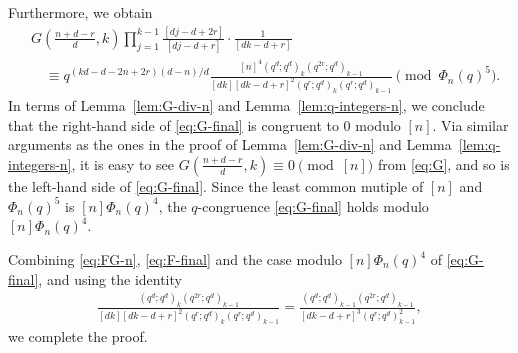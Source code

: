 \documentclass[12pt]{article}
\numberwithin{equation}{section}
\begin{document}
Furthermore, we obtain
\begin{align}\label{eq:G-final}
    &G\left(\frac{n+d-r}{d},k\right)\prod_{j=1}^{k-1}\frac{[dj-d+2r]}{[dj-d+r]}\cdot\frac{1}{[dk-d+r]}\nonumber\\
    &\hspace{1em}\equiv q^{(kd-d-2n+2r)(d-n)/d}\frac{[n]^4(q^d;q^d)_{k}(q^{2r};q^d)_{k-1}}{[dk][dk-d+r]^2 (q^r;q^d)_k(q^r;q^d)_{k-1}}\pmod{\Phi_n(q)^5}.
\end{align}
In terms of Lemma~\ref{lem:G-div-n} and Lemma~\ref{lem:q-integers-n}, we conclude that the right-hand side of \eqref{eq:G-final} is congruent to 0 modulo $[n]$.
Via similar arguments as the ones in the proof of Lemma~\ref{lem:G-div-n} and Lemma~\ref{lem:q-integers-n}, it is easy to see $G(\frac{n+d-r}{d},k)\equiv0 \pmod{[n]}$
from \eqref{eq:G}, and so is the left-hand side of \eqref{eq:G-final}. Since the least common mutiple of $[n]$ and $\Phi_n(q)^5$ is $[n]\Phi_n(q)^4$, the $q$-congruence
\eqref{eq:G-final} holds modulo $[n]\Phi_n(q)^4$. \par
Combining \eqref{eq:FG-n}, \eqref{eq:F-final} and the case modulo $[n]\Phi_n(q)^4$ of \eqref{eq:G-final}, and using the identity
\begin{align}\label{eq:iden}
    \frac{(q^d;q^d)_{k}(q^{2r};q^d)_{k-1}}{[dk][dk-d+r]^2 (q^r;q^d)_k(q^r;q^d)_{k-1}}=
    \frac{(q^d;q^d)_{k-1}(q^{2r};q^d)_{k-1}}{[dk-d+r]^3(q^r;q^d)^2_{k-1}},
\end{align}
we complete the proof.
\end{document}
